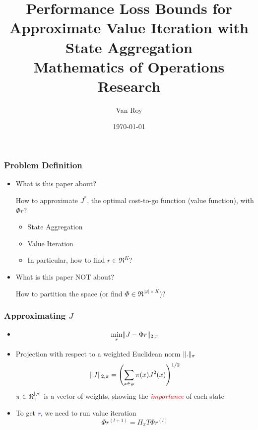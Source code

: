 \documentclass{beamer}
\title{Performance Loss Bounds for Approximate Value Iteration with State Aggregation \\ {\tiny Mathematics of Operations Research}}
\author{Van Roy}
\date{\today}
\DeclarePairedDelimiter{\norm}{\lVert}{\rVert}
\DeclarePairedDelimiter\abs{\lvert}{\rvert}%
\newcommand{\tc}[2]{\textcolor{#1}{#2}}
\newcommand{\tcb}[1]{\tc{blue}{#1}}
\newcommand{\tcr}[1]{\tc{red}{#1}}
\begin{document}
\begin{frame}
	\maketitle

\end{frame}
\begin{frame}
	\frametitle{Problem Definition}
	\begin{itemize}
		\item What is this paper about?

		How to approximate $J^*$, the optimal cost-to-go function (value function), with $\Phi r$?
		\begin{itemize}
			\item State Aggregation
			\item Value Iteration
			\item In particular, how to find $r \in \Re^K$?
		\end{itemize}
		\item What is this paper NOT about?

		How to partition the space (or find $\Phi \in \Re^{|\varphi| \times K}$)?
	\end{itemize}

\end{frame}


\begin{frame}
	\frametitle{Approximating $J$}
	\begin{itemize}
		\item 
		\begin{equation} \label{eq:min}
			\min\limits_{r} \norm{J - \Phi r}_{2,\pi}
		\end{equation}
		\item Projection with respect to a weighted Euclidean norm $\norm{.}_\pi$
		\[
			\norm{J}_{2,\pi} = \left( \sum_{x \in \varphi}{\pi (x) J^2(x)} \right)^{1/2}
		\]
		$\pi \in \Re_{+}^{\abs{\varphi}}$ is a vector of weights, showing the \tcr{\emph{importance}} of each state
		\item To get \textit{\LARGE \tcb{r}}, we need to run value iteration
		\[
			\Phi r^{(l+1)} = \Pi_{\pi} T \Phi r^{(l)}
		\]
	\end{itemize}
\end{frame}
\end{document}
